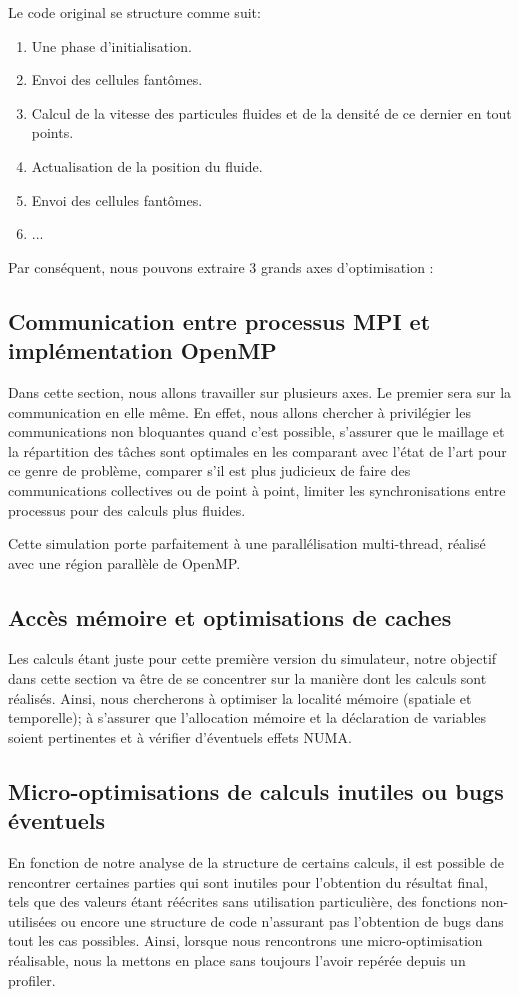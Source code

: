 Le code original se structure comme suit:
\begin{enumerate}
	\item Une phase d'initialisation.
	\item Envoi des cellules fantômes.
	\item Calcul de la vitesse des particules fluides et de la densité de ce dernier en tout points.
	\item Actualisation de la position du fluide.
	\item Envoi des cellules fantômes.
	\item ...
\end{enumerate}
Par conséquent, nous pouvons extraire 3 grands axes d'optimisation :

\subsection{Communication entre processus MPI et implémentation OpenMP}
Dans cette section, nous allons travailler sur plusieurs axes. Le premier sera sur la communication en elle même. En effet, nous allons chercher à privilégier les communications non bloquantes quand c'est possible, s'assurer que le maillage et la répartition des tâches sont optimales en les comparant avec l'état de l'art pour ce genre de problème, comparer s'il est plus judicieux de faire des communications collectives ou de point à point, limiter les synchronisations entre processus pour des calculs plus fluides.

Cette simulation porte parfaitement à une parallélisation multi-thread, réalisé avec une région parallèle de OpenMP.

\subsection{Accès mémoire et optimisations de caches}
Les calculs étant juste pour cette première version du simulateur, notre objectif dans cette section va être de se concentrer sur la manière dont les calculs sont réalisés. Ainsi, nous chercherons à optimiser la localité mémoire (spatiale et temporelle); à s'assurer que l'allocation mémoire et la déclaration de variables soient pertinentes et à vérifier d'éventuels effets NUMA.

\subsection{Micro-optimisations de calculs inutiles ou bugs éventuels}
En fonction de notre analyse de la structure de certains calculs, il est possible de rencontrer certaines parties qui sont inutiles pour l'obtention du résultat final, tels que des valeurs étant réécrites sans utilisation particulière, des fonctions non-utilisées ou encore une structure de code n'assurant pas l'obtention de bugs dans tout les cas possibles. Ainsi, lorsque nous rencontrons une micro-optimisation réalisable, nous la mettons en place sans toujours l'avoir repérée depuis un profiler.


 